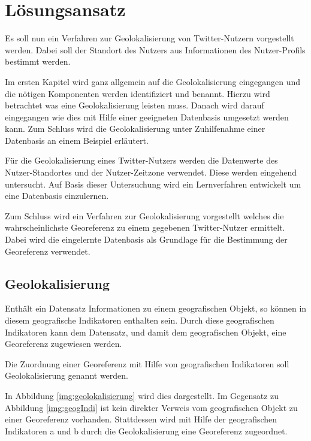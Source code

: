 \chapter{Lösungsansatz} \label{chp:Loesungsansatz}
	
	Es soll nun ein Verfahren zur Geolokalisierung von Twitter-Nutzern vorgestellt werden.
	Dabei soll der Standort des Nutzers aus Informationen des Nutzer-Profils bestimmt werden.

	Im ersten Kapitel wird ganz allgemein auf die Geolokalisierung eingegangen und die nötigen Komponenten werden identifiziert und benannt.
	Hierzu wird betrachtet was eine Geolokalisierung leisten muss.
	Danach wird darauf eingegangen wie dies mit Hilfe einer geeigneten Datenbasis umgesetzt werden kann.
	Zum Schluss wird die Geolokalisierung unter Zuhilfenahme einer Datenbasis an einem Beispiel erläutert.

	Für die Geolokalisierung eines Twitter-Nutzers werden die Datenwerte des Nutzer-Standortes und der Nutzer-Zeitzone verwendet.
	Diese werden eingehend untersucht.
	Auf Basis dieser Untersuchung wird ein Lernverfahren entwickelt um eine Datenbasis einzulernen.

	Zum Schluss wird ein Verfahren zur Geolokalisierung vorgestellt welches die wahrscheinlichste Georeferenz zu einem gegebenen Twitter-Nutzer ermittelt.
	Dabei wird die eingelernte Datenbasis als Grundlage für die Bestimmung der Georeferenz verwendet.
	
	\newpage
	
	\section{Geolokalisierung} \label{sec:ueberblick} 

		Enthält ein Datensatz Informationen zu einem geografischen Objekt, so können in diesem geografische Indikatoren enthalten sein.
		Durch diese geografischen Indikatoren kann dem Datensatz, und damit dem geografischen Objekt, eine Georeferenz zugewiesen werden. 

		Die Zuordnung einer Georeferenz mit Hilfe von geografischen Indikatoren soll Geolokalisierung genannt werden.  

		In Abbildung \ref{img:geolokalisierung} wird dies dargestellt.
		Im Gegensatz zu Abbildung \ref{img:geogIndi} ist kein direkter Verweis vom geografischen Objekt zu einer Georeferenz vorhanden. 
		Stattdessen wird mit Hilfe der geografischen Indikatoren a und b durch die Geolokalisierung eine Georeferenz zugeordnet.

